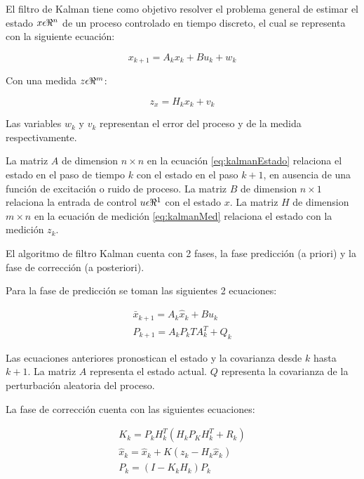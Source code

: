 El filtro de Kalman tiene como objetivo resolver el problema general de estimar el estado $x \space \epsilon \space \Re^{n}$ de un proceso controlado en tiempo discreto, el cual se representa con la siguiente ecuación:

\begin{equation}
\label{eq:kalmanEstado}
    x_{k+1} = A_kx_k + Bu_k + w_k
\end{equation}

Con una medida $z \space \epsilon \space \Re^{m}$:

\begin{equation}
\label{eq:kalmanMed}
    z_x = H_kx_k + v_k
\end{equation}

Las variables $w_k$ y $v_k$ representan el error del proceso y de la medida respectivamente.

La matriz $A$  de dimension $n\times{}n$ en la ecuación \eqref{eq:kalmanEstado} relaciona el estado en el paso de tiempo $k$ con el estado en el paso $k + 1$, en ausencia de una función de excitación o ruido de proceso. La matriz $B$ de dimension $n\times{}1$ relaciona la entrada de control $u \space \epsilon \Re^{1}$ con el estado $x$. La matriz $H$ de dimension $m\times{}n$ en la ecuación de medición \eqref{eq:kalmanMed} relaciona el estado con la medición $z_k$.

El algoritmo de filtro Kalman cuenta con 2 fases, la fase predicción (a priori) y la fase de corrección (a posteriori).

Para la fase de predicción se toman las siguientes 2 ecuaciones:

\begin{eqnarray}
    \label{eq:kalmanActUno}
    \bar{x}_{k+1} = A_k\hat{x}_k + Bu_k\\
    \label{eq:kalmanActDos}
    P_{k+1} = A_kP_kTA^{T}_k + Q_k
\end{eqnarray}


Las ecuaciones anteriores pronostican el estado y la covarianza desde $k$ hasta $k+1$. La matriz $A$ representa el estado actual. $Q$ representa la covarianza de la perturbación aleatoria del proceso.

La fase de corrección cuenta con las siguientes ecuaciones:

\begin{eqnarray}
\label{eq:kalmanCorrUno}
K_k = P_kH^{T}_k(H_kP_KH^{T}_k + R_k)\\
\label{eq:kalmanCorrDos}
\hat{x}_k = \hat{x}_k + K(z_k - H_k \hat{x}_k)\\
\label{eq:kalmanCorrTres}
P_k = (I - K_kH_k)P_k
\end{eqnarray}

